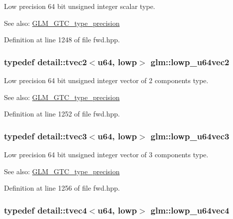 Low precision 64 bit unsigned integer scalar type. \begin{Desc}
\item[See also:]\hyperlink{group__gtc__type__precision}{GLM\_\-GTC\_\-type\_\-precision} \end{Desc}


Definition at line 1248 of file fwd.hpp.\hypertarget{group__gtc__type__precision_ge0e7d3ed32e8e79b4f6dd0c9baafcaea}{
\subsubsection[lowp\_\-u64vec2]{\setlength{\rightskip}{0pt plus 5cm}typedef detail::tvec2$<$u64, lowp$>$ {\bf glm::lowp\_\-u64vec2}}}
\label{group__gtc__type__precision_ge0e7d3ed32e8e79b4f6dd0c9baafcaea}


Low precision 64 bit unsigned integer vector of 2 components type. \begin{Desc}
\item[See also:]\hyperlink{group__gtc__type__precision}{GLM\_\-GTC\_\-type\_\-precision} \end{Desc}


Definition at line 1252 of file fwd.hpp.\hypertarget{group__gtc__type__precision_ga62794e3f055a333a85c0e52376f2429}{
\subsubsection[lowp\_\-u64vec3]{\setlength{\rightskip}{0pt plus 5cm}typedef detail::tvec3$<$u64, lowp$>$ {\bf glm::lowp\_\-u64vec3}}}
\label{group__gtc__type__precision_ga62794e3f055a333a85c0e52376f2429}


Low precision 64 bit unsigned integer vector of 3 components type. \begin{Desc}
\item[See also:]\hyperlink{group__gtc__type__precision}{GLM\_\-GTC\_\-type\_\-precision} \end{Desc}


Definition at line 1256 of file fwd.hpp.\hypertarget{group__gtc__type__precision_g1dc6d791a39dc52ee296a891d5b9b084}{
\subsubsection[lowp\_\-u64vec4]{\setlength{\rightskip}{0pt plus 5cm}typedef detail::tvec4$<$u64, lowp$>$ {\bf glm::lowp\_\-u64vec4}}}
\label{group__gtc__type__precision_g1dc6d791a39dc52ee296a891d5b9b084}


